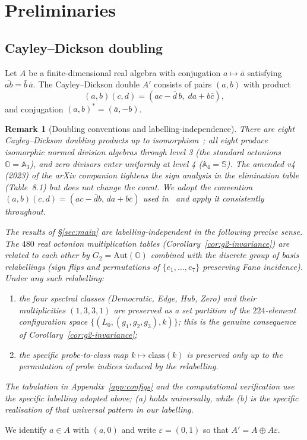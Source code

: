 \documentclass[12pt,a4paper]{article}
\newtheorem{remark}[theorem]{Remark}
\begin{document}
\section{Preliminaries}\label{sec:prelim}

\subsection{Cayley--Dickson doubling}\label{subsec:cd}
Let $A$ be a finite-dimensional real algebra with conjugation $a\mapsto \bar a$ satisfying $\overline{ab}=\bar b\,\bar a$.
The Cayley--Dickson double $A'$ consists of pairs $(a,b)$ with product
\begin{equation}\label{eq:cd-doubling}
(a,b)(c,d)=(ac-\bar d\,b,\; da+b\bar c),
\end{equation}
and conjugation $(a,b)^*=(\bar a,-b)$.

\begin{remark}[Doubling conventions and labelling-independence]
\label{rem:doubling}
There are eight Cayley--Dickson doubling products up to isomorphism~\cite{bales2017}; all eight produce isomorphic normed division algebras through level 3 (the standard octonions $\mathbb{O} = \mathbb{A}_3$), and zero divisors enter uniformly at level 4 ($\mathbb{A}_4 = \mathbb{S}$). The amended v4 (2023) of the arXiv companion tightens the sign analysis in the elimination table (Table~8.1) but does not change the count. We adopt the convention $(a, b)(c, d) = (ac - \bar{d}b, \, da + b\bar{c})$ used in~\cite[\S6.1]{ConwaySmith2003} and apply it consistently throughout.

The results of \S\ref{sec:main} are labelling-independent in the following precise sense. The $480$ real octonion multiplication tables (Corollary~\ref{cor:g2-invariance}) are related to each other by $G_2 = \mathrm{Aut}(\mathbb{O})$ combined with the discrete group of basis relabellings (sign flips and permutations of $\{e_1, \ldots, e_7\}$ preserving Fano incidence). Under any such relabelling:
\begin{enumerate}[label=(\alph*)]
    \item the four spectral classes (Democratic, Edge, Hub, Zero) and their multiplicities $(1, 3, 3, 1)$ are preserved as a \emph{set partition} of the $224$-element configuration space $\{(L_0, (g_1, g_2, g_3), k)\}$; this is the genuine consequence of Corollary~\ref{cor:g2-invariance};
    \item the specific probe-to-class map $k \mapsto \text{class}(k)$ is preserved only up to the permutation of probe indices induced by the relabelling.
\end{enumerate}
The tabulation in Appendix~\ref{app:configs} and the computational verification use the specific labelling adopted above; (a) holds universally, while (b) is the specific realisation of that universal pattern in our labelling.
\end{remark}
We identify $a\in A$ with $(a,0)$ and write $\varepsilon=(0,1)$ so that $A'=A\oplus A\varepsilon$.
\end{document}
